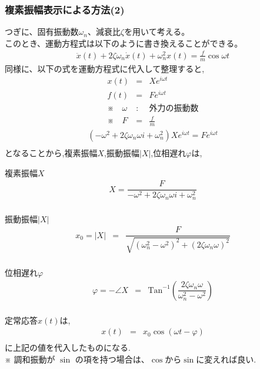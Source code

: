 \documentclass[a4paper]{jsarticle}
\begin{document}
\subsubsection{複素振幅表示による方法(2)}
つぎに、固有振動数$\omega_n$、減衰比$\zeta$を用いて考える。\\
このとき、運動方程式は以下のように書き換えることができる。
\begin{eqnarray*}
    \ddot{x}\left(t\right)+2\zeta\omega_n\dot{x}\left(t\right)+\omega_n^2 x\left(t\right)=\frac{f}{m}\cos\omega t
\end{eqnarray*}
同様に、以下の式を運動方程式に代入して整理すると,
\begin{eqnarray*}
    x\left(t\right)&=&Xe^{i\omega t}\\
    f\left(t\right)&=&Fe^{i\omega t}\\
    ※\quad\omega &:& 外力の振動数\\
    ※\quad F &=& \frac{f}{m}
\end{eqnarray*}
\begin{eqnarray*}
    \left(-\omega^2+2\zeta\omega_n\omega i+\omega_n^2\right)Xe^{i\omega t}=Fe^{i\omega t}\\
\end{eqnarray*}
となることから,複素振幅$X$,振動振幅$|X|$,位相遅れ$\varphi$は,
\begin{itembox}[l]{複素振幅$X$}
    \begin{eqnarray*}
        X=\dfrac{F}{-\omega^2+2\zeta\omega_n\omega i+\omega_n^2}\\
    \end{eqnarray*}
\end{itembox}
\begin{itembox}[l]{振動振幅$|X|$}
    \begin{eqnarray*}
        x_0=|X|&=&\dfrac{F}{\sqrt{\left(\omega_n^2-\omega^2\right)^2+\left(2\zeta\omega_n\omega\right)^2}}\\
    \end{eqnarray*}
\end{itembox}
\begin{itembox}[l]{位相遅れ$\varphi$}
    \begin{eqnarray*}
        \varphi=-\angle X &=&\mathrm{Tan}^{-1}\left(\dfrac{2\zeta\omega_n\omega}{\omega_n^2-\omega^2}\right)\\
    \end{eqnarray*}
\end{itembox}
定常応答$x\left(t\right)$は,
\begin{eqnarray*}
    x\left(t\right)&=&x_0\cos\left(\omega t-\varphi\right)\\
\end{eqnarray*}
に上記の値を代入したものになる.\\
※ 調和振動が $\sin$ の項を持つ場合は、$\cos$から$\sin$に変えれば良い.
\end{document}
